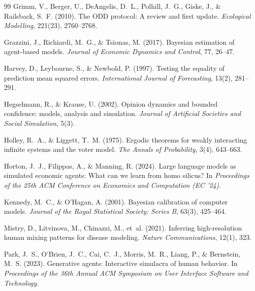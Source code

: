\documentclass[12pt]{article}
\begin{document}
\begin{thebibliography}{99}
Grimm, V., Berger, U., DeAngelis, D.~L., Polhill, J.~G., Giske, J., \& Railsback, S.~F. (2010).
\newblock The ODD protocol: A review and first update.
\newblock \textit{Ecological Modelling}, 221(23), 2760--2768.

Grazzini, J., Richiardi, M.~G., \& Tsionas, M. (2017).
\newblock Bayesian estimation of agent-based models.
\newblock \textit{Journal of Economic Dynamics and Control}, 77, 26--47.

Harvey, D., Leybourne, S., \& Newbold, P. (1997).
\newblock Testing the equality of prediction mean squared errors.
\newblock \textit{International Journal of Forecasting}, 13(2), 281--291.

Hegselmann, R., \& Krause, U. (2002).
\newblock Opinion dynamics and bounded confidence: models, analysis and simulation.
\newblock \textit{Journal of Artificial Societies and Social Simulation}, 5(3).

Holley, R.~A., \& Liggett, T.~M. (1975).
\newblock Ergodic theorems for weakly interacting infinite systems and the voter model.
\newblock \textit{The Annals of Probability}, 3(4), 643--663.

Horton, J.~J., Filippas, A., \& Manning, R. (2024).
\newblock Large language models as simulated economic agents: What can we learn from homo silicus?
\newblock In \textit{Proceedings of the 25th ACM Conference on Economics and Computation (EC '24)}.

Kennedy, M.~C., \& O'Hagan, A. (2001).
\newblock Bayesian calibration of computer models.
\newblock \textit{Journal of the Royal Statistical Society: Series B}, 63(3), 425--464.

Mistry, D., Litvinova, M., Chinazzi, M., et~al. (2021).
\newblock Inferring high-resolution human mixing patterns for disease modeling.
\newblock \textit{Nature Communications}, 12(1), 323.

Park, J.~S., O'Brien, J.~C., Cai, C.~J., Morris, M.~R., Liang, P., \& Bernstein, M.~S. (2023).
\newblock Generative agents: Interactive simulacra of human behavior.
\newblock In \textit{Proceedings of the 36th Annual ACM Symposium on User Interface Software and Technology}.


\end{thebibliography}
\end{document}
